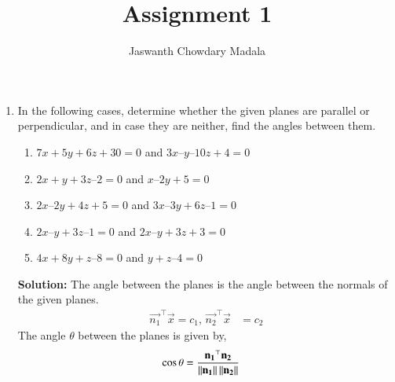 \documentclass[journal,12pt,twocolumn]{IEEEtran}
\begin{document}
\vspace{3cm}


\title{Assignment 1}
\author{Jaswanth Chowdary Madala}





\maketitle

\newpage


\bigskip

\renewcommand{\thefigure}{\theenumi}
\renewcommand{\thetable}{\theenumi}

\begin{enumerate}
\item In the following cases, determine whether the given planes are parallel or perpendicular, and in case they are neither, find the angles between them.
\begin{enumerate}
\item $7x + 5y + 6z + 30 = 0$ and $3x – y – 10z + 4 = 0$
\item $2x + y + 3z – 2 = 0$ and $x – 2y + 5 = 0$
\item $2x – 2y + 4z + 5 = 0$ and $3x – 3y + 6z – 1 = 0$
\item $2x – y + 3z – 1 = 0$ and $2x – y + 3z + 3 = 0$
\item $4x + 8y + z – 8 = 0$ and $y + z – 4 = 0$
\end{enumerate}

\textbf{Solution:} The angle between the planes is the angle between the normals of the given planes.
\begin{align}
\vec{n_1}^{\top}\vec{x} = c_1, \, \vec{n_2}^{\top}\vec{x} &= c_2
\end{align}
The angle $\theta$ between the planes is given by,
\begin{align}
\cos{\theta} &= \frac{\mathbf{n_1}^{\top}\mathbf{n_2}}{\left\lVert\mathbf{n_1}\right\rVert\left\lVert\mathbf{n_2}\right\rVert}
\end{align}


\end{enumerate}
\end{document}
